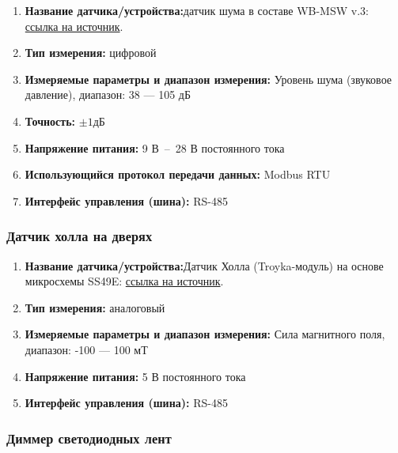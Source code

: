 \documentclass[a4paper,14pt]{extarticle}
\begin{document}
\begin{enumerate}
	\item \textbf{Название датчика/устройства:}датчик шума в составе WB-MSW v.3:  \href{https://wirenboard.com/ru/product/wb-msw-v3/}{ссылка на источник}.
	
	
	\item \textbf{Тип измерения:} цифровой
	
	\item  \textbf{Измеряемые параметры и диапазон измерения:}  Уровень шума (звуковое давление), диапазон: 38 --- 105 дБ
	
	\item  \textbf{Точность:} $\pm1 дБ$	
	\item  \textbf{Напряжение питания:} 9 В~--~28 В постоянного тока
	
	\item  \textbf{Использующийся протокол передачи данных:} Modbus RTU
	
	\item  \textbf{Интерфейс управления (шина):} RS-485

\end{enumerate}


\subsubsection*{Датчик холла на дверях}

\begin{enumerate}
	\item \textbf{Название датчика/устройства:}Датчик Холла (Troyka-модуль) на основе микросхемы SS49E: \href{https://amperka.ru/product/troyka-hall-sensor}{ссылка на источник}.
		
	
	\item \textbf{Тип измерения:} аналоговый
	
	\item  \textbf{Измеряемые параметры и диапазон измерения:} Сила магнитного поля, диапазон: -100 --- 100 мТ
	
	\item  \textbf{Напряжение питания:} 5 В постоянного тока
	
	\item  \textbf{Интерфейс управления (шина):} RS-485
\end{enumerate}

\subsubsection*{Диммер светодиодных лент}
\end{document}
